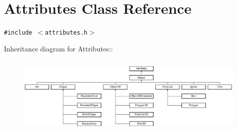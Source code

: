 \section{Attributes Class Reference}
\label{classAttributes}
{\tt \#include $<$attributes.h$>$}

Inheritance diagram for Attributes::\begin{figure}[H]
\begin{center}
\leavevmode
\includegraphics[height=3.82812cm]{classAttributes}
\end{center}
\end{figure}
